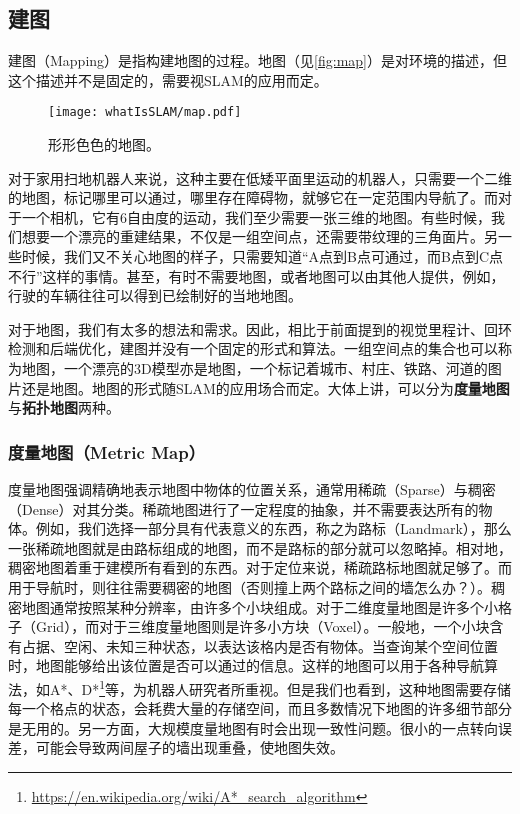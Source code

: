 
\subsection{建图}
建图（Mapping）是指构建地图的过程。地图（见\autoref{fig:map}）是对环境的描述，但这个描述并不是固定的，需要视SLAM的应用而定。

\begin{figure}[!htp]
	\centering
	\texttt{[image: whatIsSLAM/map.pdf]}
	\caption{形形色色的地图\textsuperscript{\cite{Beeson2010}}。}
	\label{fig:map}
\end{figure}

对于家用扫地机器人来说，这种主要在低矮平面里运动的机器人，只需要一个二维的地图，标记哪里可以通过，哪里存在障碍物，就够它在一定范围内导航了。而对于一个相机，它有6自由度的运动，我们至少需要一张三维的地图。有些时候，我们想要一个漂亮的重建结果，不仅是一组空间点，还需要带纹理的三角面片。另一些时候，我们又不关心地图的样子，只需要知道“A点到B点可通过，而B点到C点不行”这样的事情。甚至，有时不需要地图，或者地图可以由其他人提供，例如，行驶的车辆往往可以得到已绘制好的当地地图。

对于地图，我们有太多的想法和需求。因此，相比于前面提到的视觉里程计、回环检测和后端优化，建图并没有一个固定的形式和算法。一组空间点的集合也可以称为地图，一个漂亮的3D模型亦是地图，一个标记着城市、村庄、铁路、河道的图片还是地图。地图的形式随SLAM的应用场合而定。大体上讲，可以分为\textbf{度量地图}与\textbf{拓扑地图}两种。

\clearpage

\subsubsection{度量地图（Metric Map）}
度量地图强调精确地表示地图中物体的位置关系，通常用稀疏（Sparse）与稠密（Dense）对其分类。稀疏地图进行了一定程度的抽象，并不需要表达所有的物体。例如，我们选择一部分具有代表意义的东西，称之为路标（Landmark），那么一张稀疏地图就是由路标组成的地图，而不是路标的部分就可以忽略掉。相对地，稠密地图着重于建模所有看到的东西。对于定位来说，稀疏路标地图就足够了。而用于导航时，则往往需要稠密的地图（否则撞上两个路标之间的墙怎么办？）。稠密地图通常按照某种分辨率，由许多个小块组成。对于二维度量地图是许多个小格子（Grid），而对于三维度量地图则是许多小方块（Voxel）。一般地，一个小块含有占据、空闲、未知三种状态，以表达该格内是否有物体。当查询某个空间位置时，地图能够给出该位置是否可以通过的信息。这样的地图可以用于各种导航算法，如A*、D*\footnote{\url{https://en.wikipedia.org/wiki/A*_search_algorithm}}等，为机器人研究者所重视。但是我们也看到，这种地图需要存储每一个格点的状态，会耗费大量的存储空间，而且多数情况下地图的许多细节部分是无用的。另一方面，大规模度量地图有时会出现一致性问题。很小的一点转向误差，可能会导致两间屋子的墙出现重叠，使地图失效。

